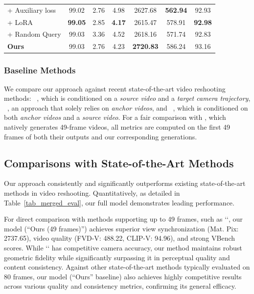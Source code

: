 \begin{table}[t]
\begin{center}
{\begin{tabular}{lc|cc|ccc}
\quad + Auxiliary loss
        & 99.02 & 2.76 & 4.98 & 2627.68 & \textbf{562.94} & 92.93 \\

\quad + LoRA
        & \textbf{99.05} & 2.85 & \textbf{4.17} & 2615.47 & 578.91 & \textbf{92.98} \\

\quad + Random Query
        & 99.03 & 3.36 & 4.52 & 2618.16 & 571.74 & 92.83 \\

 \midrule
 \textbf{Ours} & 99.03 & 2.76 & 4.23 & \textbf{2720.83} & 586.24 & 93.16 \\
 \bottomrule
 \end{tabular}
 }
\end{center}

    \vspace{-0.25in}
\end{table}


\subsubsection{Baseline Methods}
\label{sec:baselines}

We compare our approach against recent state-of-the-art video reshooting methods: \recammaster{}~\cite{bai2025recammaster}, which is conditioned on a \textit{source video} and a \textit{target camera trajectory}, \exfd{}~\cite{ex4d}, an approach that solely relies on \textit{anchor videos}, and \trajectorycrafter{}~\cite{yu2025trajectorycrafter}, which is conditioned on both \textit{anchor videos} and a \textit{source video}. For a fair comparison with \trajectorycrafter{}, which natively generates 49-frame videos, all metrics are computed on the first 49 frames of both their outputs and our corresponding generations.

\subsection{Comparisons with State-of-the-Art Methods}
\label{sec:comparisons}

Our approach consistently and significantly outperforms existing state-of-the-art methods in video reshooting. Quantitatively, as detailed in Table~\ref{tab_merged_eval}, our full model demonstrates leading performance.

For direct comparison with methods supporting up to 49 frames, such as `\trajectorycrafter{}`, our model (``Ours (49 frames)'') achieves superior view synchronization (Mat. Pix: 2737.65), video quality (FVD-V: 488.22, CLIP-V: 94.96), and strong VBench scores. While `\trajectorycrafter{}` has competitive camera accuracy, our method maintains robust geometric fidelity while significantly surpassing it in perceptual quality and content consistency. Against other state-of-the-art methods typically evaluated on 80 frames, our model (``Ours'' baseline) also achieves highly competitive results across various quality and consistency metrics, confirming its general efficacy.

